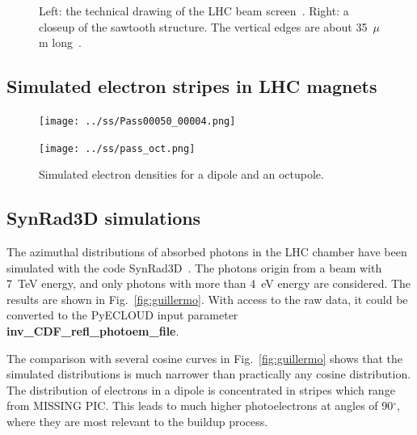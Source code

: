 \begin{figure}[tbh]
\begin{minipage}[c]{0.47\textwidth}
    \end{minipage}
\caption{
        Left: the technical drawing of the LHC beam screen~\cite{beam_screen_drawing}. Right: a closeup of the sawtooth structure. The vertical edges are about 35~$\mu$m long~\cite{zimmermann}.
        }
\label{fig:beam_screen_structure}
\end{figure}

\subsection{Simulated electron stripes in LHC magnets}

\begin{figure}[tbh]
    \centering
    \begin{minipage}[c]{0.47\textwidth}
        \texttt{[image: ../ss/Pass00050\_00004.png]}
    \end{minipage}
    \hspace{0.5cm}
    \begin{minipage}[c]{0.47\textwidth}
        \texttt{[image: ../ss/pass\_oct.png]}
    \end{minipage}
    \caption{Simulated electron densities for a dipole and an octupole.}
    \label{fig:sim_densities}
\end{figure}

\subsection{SynRad3D simulations}
The azimuthal distributions of absorbed photons in the LHC chamber have been simulated with the code SynRad3D~\cite{guillermo}.
The photons origin from a beam with 7~TeV energy, and only photons with more than 4~eV energy are considered.
The results are shown in Fig.~\ref{fig:guillermo}.
With access to the raw data, it could be converted to the PyECLOUD input parameter \textbf{inv\_CDF\_refl\_photoem\_file}.

The comparison with several cosine curves in Fig.~\ref{fig:guillermo} shows that the simulated distributions is much narrower than practically any cosine distribution.
The distribution of electrons in a dipole is concentrated in stripes which range from MISSING PIC.
This leads to much higher photoelectrons at angles of 90$^\circ$, where they are most relevant to the buildup process.

